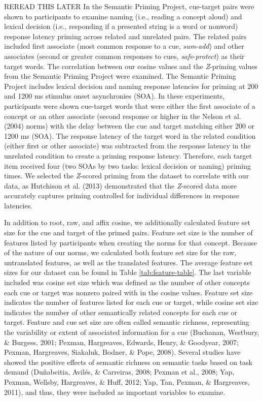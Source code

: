 \documentclass[english,,man]{apa6}
\begin{document}
REREAD THIS LATER
In the Semantic Priming Project, cue-target pairs were shown to participants to examine naming (i.e., reading a concept aloud) and lexical decision (i.e., responding if a presented string is a word or nonword) response latency priming across related and unrelated pairs. The related pairs included first associate (most common response to a cue, \emph{sum}-\emph{add}) and other associates (second or greater common responses to cues, \emph{safe}-\emph{protect}) as their target words. The correlation between our cosine values and the \emph{Z}-priming values from the Semantic Priming Project were examined. The Semantic Priming Project includes lexical decision and naming response latencies for priming at 200 and 1200 ms stimulus onset asynchronies (SOA). In these experiments, participants were shown cue-target words that were either the first associate of a concept or an other associate (second response or higher in the Nelson et al. (2004) norms) with the delay between the cue and target matching either 200 or 1200 ms (SOA). The response latency of the target word in the related condition (either first or other associate) was subtracted from the response latency in the unrelated condition to create a priming response latency. Therefore, each target item received four (two SOAs by two tasks: lexical decision or naming) priming times. We selected the \emph{Z}-scored priming from the dataset to correlate with our data, as Hutchison et al. (2013) demonstrated that the \emph{Z}-scored data more accurately captures priming controlled for individual differences in response latencies.

In addition to root, raw, and affix cosine, we additionally calculated feature set size for the cue and target of the primed pairs. Feature set size is the number of features listed by participants when creating the norms for that concept. Because of the nature of our norms, we calculated both feature set size for the raw, untranslated features, as well as the translated features. The average feature set sizes for our dataset can be found in Table \ref{tab:feature-table}. The last variable included was cosine set size which was defined as the number of other concepts each cue or target was nonzero paired with in the cosine values. Feature set size indicates the number of features listed for each cue or target, while cosine set size indicates the number of other semantically related concepts for each cue or target. Feature and cue set size are often called semantic richness, representing the variability or extent of associated information for a cue (Buchanan, Westbury, \& Burgess, 2001; Pexman, Hargreaves, Edwards, Henry, \& Goodyear, 2007; Pexman, Hargreaves, Siakaluk, Bodner, \& Pope, 2008). Several studies have showed the positive effects of semantic richness on semantic tasks based on task demand (Duñabeitia, Avilés, \& Carreiras, 2008; Pexman et al., 2008; Yap, Pexman, Wellsby, Hargreaves, \& Huff, 2012; Yap, Tan, Pexman, \& Hargreaves, 2011), and thus, they were included as important variables to examine.
\end{document}
